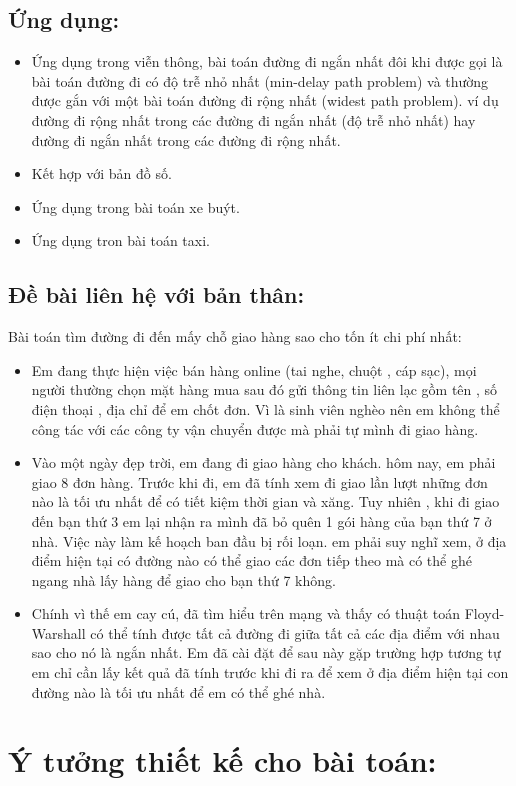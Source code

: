\documentclass{article}
\begin{document}
\subsection{Ứng dụng:}
\begin{itemize}
\item Ứng dụng trong viễn thông, bài toán đường đi ngắn nhất đôi khi được gọi là bài toán đường đi có độ trễ nhỏ nhất (min-delay path problem) và thường được gắn với một bài toán đường đi rộng nhất (widest path problem). ví dụ đường đi rộng nhất trong các đường đi ngắn nhất (độ trễ nhỏ nhất) hay đường đi ngắn nhất trong các đường đi rộng nhất.
\item Kết hợp với bản đồ số.
\item Ứng dụng trong bài toán xe buýt.
\item Ứng dụng tron bài toán taxi.
\end{itemize}
\subsection{Đề bài liên hệ với bản thân:}
Bài toán tìm đường đi đến mấy chỗ giao hàng sao cho tốn ít chi phí nhất:
\begin{itemize}
\item Em đang thực hiện việc bán hàng online (tai nghe, chuột , cáp sạc), mọi người thường chọn mặt hàng mua sau đó gửi thông tin liên lạc gồm tên , số điện thoại , địa chỉ để em chốt đơn. Vì là sinh viên nghèo nên em không thể công tác với các công ty vận chuyển được mà phải tự mình đi giao hàng.
\item Vào một ngày đẹp trời, em đang đi giao hàng cho khách. hôm nay, em phải giao 8 đơn hàng. Trước khi đi, em đã tính xem đi giao lần lượt những đơn nào là tối ưu nhất để có tiết kiệm thời gian và xăng. Tuy nhiên , khi đi giao đến bạn thứ 3 em lại nhận ra mình đã bỏ quên 1 gói hàng của bạn thứ 7 ở nhà. Việc này làm kế hoạch ban đầu bị rối loạn. em phải suy nghĩ xem, ở địa điểm hiện tại có đường nào có thể giao các đơn tiếp theo mà có thể ghé ngang nhà lấy hàng để giao cho bạn thứ 7 không.
\item Chính vì thế em cay cú, đã tìm hiểu trên mạng và thấy có thuật toán Floyd-Warshall có thể tính được tất cả đường đi giữa tất cả các địa điểm với nhau sao cho nó là ngắn nhất. Em đã cài đặt để sau này gặp trường hợp tương tự em chỉ cần lấy kết quả đã tính trước khi đi ra để xem ở địa điểm hiện tại con đường nào là tối ưu nhất để em có thể ghé nhà.
\end{itemize}
\section{Ý tưởng thiết kế cho bài toán:}
\end{document}
